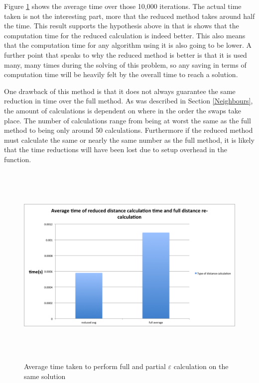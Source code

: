 \documentclass[12pt]{report}
\begin{document}
Figure \ref{f_recalcComparison} shows the average time over those 10,000 iterations. The actual time taken is not the interesting part, more that the reduced method takes around half the time. This result supports the hypothesis above in that is shows that the computation time for the reduced calculation is indeed better. This also means that the computation time for any algorithm using it is also going to be lower. A further point that speaks to why the reduced method is better is that it is used many, many times during the solving of this problem, so any saving in terms of computation time will be heavily felt by the overall time to reach a solution.

One drawback of this method is that it does not always guarantee the same reduction in time over the full method. As was described in Section \ref{Neighbours}, the amount of calculations is dependent on where in the order the swaps take place. The number of calculations range from being at worst the same as the full method to being only around 50 calculations. Furthermore if the reduced method must calculate the same or nearly the same number as the full method, it is likely that the time reductions will have been lost due to setup overhead in the function.

\begin{figure}[H]
\centering
\includegraphics[width=17cm, height=10cm]{../code/misc/reducedvsFullDistanceCalc}
\caption{Average time taken to perform full and partial $\varepsilon$ calculation on the same solution}
\label{f_recalcComparison}
\end{figure}
\end{document}

